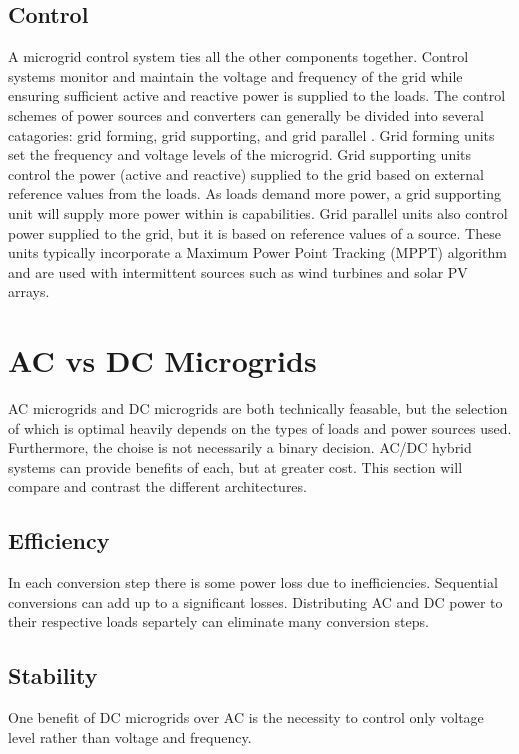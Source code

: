 \subsection{Control}
A microgrid control system ties all the other components together. Control systems monitor and maintain the voltage and frequency of the grid while ensuring sufficient active and reactive power is supplied to the loads. The control schemes of power sources and converters can generally be divided into several catagories: grid forming, grid supporting, and grid parallel \cite{Ortjohann2012}. Grid forming units set the frequency and voltage levels of the microgrid. Grid supporting units control the power (active and reactive) supplied to the grid based on external reference values from the loads. As loads demand more power, a grid supporting unit will supply more power within is capabilities. Grid parallel units also control power supplied to the grid, but it is based on reference values of a source. These units typically incorporate a Maximum Power Point Tracking (MPPT) algorithm and are used with intermittent sources such as wind turbines and solar PV arrays. 

\section{AC vs DC Microgrids}
AC microgrids and DC microgrids are both technically feasable, but the selection of which is optimal heavily depends on the types of loads and power sources used. Furthermore, the choise is not necessarily a binary decision. AC/DC hybrid systems can provide benefits of each, but at greater cost. This section will compare and contrast the different architectures.

\subsection{Efficiency}
In each conversion step there is some power loss due to inefficiencies. Sequential conversions can add up to a significant losses. Distributing AC and DC power to their respective loads separtely can eliminate many conversion steps.

\subsection{Stability}
One benefit of DC microgrids over AC is the necessity to control only voltage level rather than voltage and frequency.

